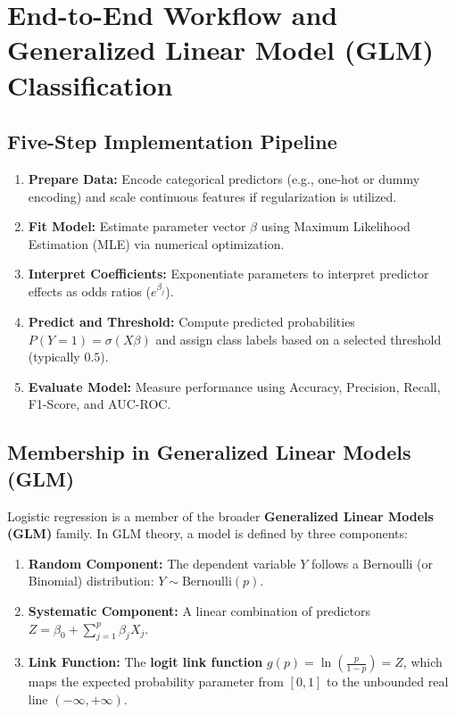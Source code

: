 \section{End-to-End Workflow and Generalized Linear Model (GLM) Classification}

\subsection{Five-Step Implementation Pipeline}
\begin{enumerate}
    \item \textbf{Prepare Data:} Encode categorical predictors (e.g., one-hot or dummy encoding) and scale continuous features if regularization is utilized.
    \item \textbf{Fit Model:} Estimate parameter vector $\beta$ using Maximum Likelihood Estimation (MLE) via numerical optimization.
    \item \textbf{Interpret Coefficients:} Exponentiate parameters to interpret predictor effects as odds ratios ($e^{\beta_j}$).
    \item \textbf{Predict and Threshold:} Compute predicted probabilities $P(Y=1) = \sigma(X\beta)$ and assign class labels based on a selected threshold (typically $0.5$).
    \item \textbf{Evaluate Model:} Measure performance using Accuracy, Precision, Recall, F1-Score, and AUC-ROC.
\end{enumerate}

\subsection{Membership in Generalized Linear Models (GLM)}
Logistic regression is a member of the broader \textbf{Generalized Linear Models (GLM)} family. In GLM theory, a model is defined by three components:
\begin{enumerate}
    \item \textbf{Random Component:} The dependent variable $Y$ follows a Bernoulli (or Binomial) distribution: $Y \sim \text{Bernoulli}(p)$.
    \item \textbf{Systematic Component:} A linear combination of predictors $Z = \beta_0 + \sum_{j=1}^p \beta_j X_j$.
    \item \textbf{Link Function:} The \textbf{logit link function} $g(p) = \ln\left(\frac{p}{1-p}\right) = Z$, which maps the expected probability parameter from $[0, 1]$ to the unbounded real line $(-\infty, +\infty)$.
\end{enumerate}
